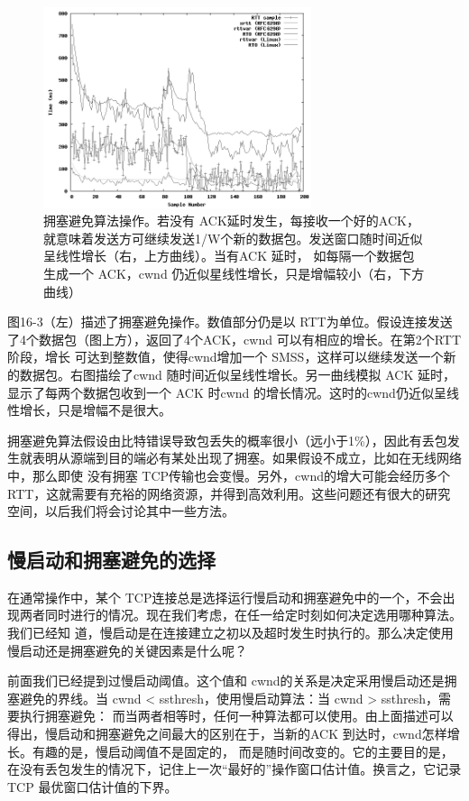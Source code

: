 \begin{figure}[!htb]
    \centering
	\includegraphics[width=0.7\textwidth]{imgs/14/14-3.png}
	\caption{拥塞避免算法操作。若没有 ACK延时发生，每接收一个好的ACK，就意味着发送方可继续发送1/W个新的数据包。发送窗口随时间近似呈线性增长（右，上方曲线）。当有ACK 延时，
    如每隔一个数据包生成一个 ACK，cwnd 仍近似星线性增长，只是增幅较小（右，下方曲线）}
\end{figure}

图16-3（左）描述了拥塞避免操作。数值部分仍是以 RTT为单位。假设连接发送了4个数据包（图上方），返回了4个ACK，cwnd 可以有相应的增长。在第2个RTT阶段，增长
可达到整数值，使得cwnd增加一个 SMSS，这样可以继续发送一个新的数据包。右图描绘了cwnd 随时间近似呈线性增长。另一曲线模拟 ACK 延时，显示了每两个数据包收到一个
ACK 时cwnd 的增长情况。这时的cwnd仍近似呈线性增长，只是增幅不是很大。

拥塞避免算法假设由比特错误导致包丢失的概率很小（远小于1\%），因此有丢包发生就表明从源端到目的端必有某处出现了拥塞。如果假设不成立，比如在无线网络中，那么即使
没有拥塞 TCP传输也会变慢。另外，cwnd的增大可能会经历多个 RTT，这就需要有充裕的网络资源，并得到高效利用。这些问题还有很大的研究空间，以后我们将会讨论其中一些方法。

\subsection{慢启动和拥塞避免的选择}
在通常操作中，某个 TCP连接总是选择运行慢启动和拥塞避免中的一个，不会出现两者同时进行的情况。现在我们考虑，在任一给定时刻如何决定选用哪种算法。我们已经知
道，慢启动是在连接建立之初以及超时发生时执行的。那么决定使用慢启动还是拥塞避免的关键因素是什么呢？

前面我们已经提到过慢启动阈值。这个值和 cwnd的关系是决定采用慢启动还是拥塞避免的界线。当 cwnd < ssthresh，使用慢启动算法：当 cwnd > ssthresh，需要执行拥塞避免：
而当两者相等时，任何一种算法都可以使用。由上面描述可以得出，慢启动和拥塞避免之间最大的区别在于，当新的ACK 到达时，cwnd怎样增长。有趣的是，慢启动阈值不是固定的，
而是随时间改变的。它的主要目的是，在没有丢包发生的情况下，记住上一次“最好的”操作窗口估计值。换言之，它记录 TCP 最优窗口估计值的下界。

